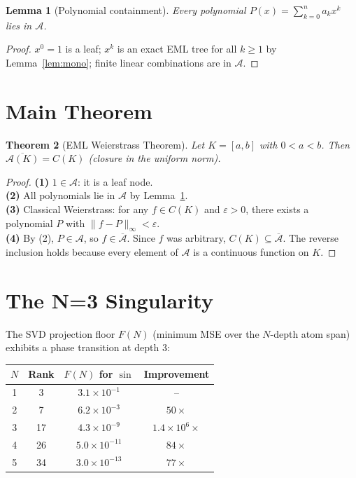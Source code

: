 \documentclass[11pt]{article}
\newtheorem{theorem}{Theorem}
\newtheorem{lemma}[theorem]{Lemma}
\theoremstyle{remark}
\begin{document}
\begin{lemma}[Polynomial containment]\label{lem:poly}
Every polynomial $P(x) = \sum_{k=0}^n a_k x^k$ lies in $\mathcal{A}$.
\end{lemma}
\begin{proof}
$x^0 = 1$ is a leaf; $x^k$ is an exact EML tree for all $k \geq 1$ by
Lemma~\ref{lem:mono}; finite linear combinations are in $\mathcal{A}$.
\end{proof}

\section{Main Theorem}

\begin{theorem}[EML Weierstrass Theorem]\label{thm:weierstrass}
Let $K = [a,b]$ with $0 < a < b$.  Then
$\overline{\mathcal{A}(K)} = C(K)$ (closure in the uniform norm).
\end{theorem}
\begin{proof}
\textbf{(1)} $1 \in \mathcal{A}$: it is a leaf node.\\
\textbf{(2)} All polynomials lie in $\mathcal{A}$ by Lemma~\ref{lem:poly}.\\
\textbf{(3)} Classical Weierstrass: for any $f \in C(K)$ and $\varepsilon > 0$,
there exists a polynomial $P$ with $\|f - P\|_\infty < \varepsilon$.\\
\textbf{(4)} By (2), $P \in \mathcal{A}$, so $f \in \overline{\mathcal{A}}$.
Since $f$ was arbitrary, $C(K) \subseteq \overline{\mathcal{A}}$.
The reverse inclusion holds because every element of $\mathcal{A}$
is a continuous function on $K$.
\end{proof}

\section{The N=3 Singularity}

The SVD projection floor $F(N)$ (minimum MSE over the $N$-depth atom span)
exhibits a phase transition at depth 3:

\begin{center}
\begin{tabular}{cccc}
\hline
$N$ & Rank & $F(N)$ for $\sin$ & Improvement \\
\hline
1 & 3  & $3.1 \times 10^{-1}$ & -- \\
2 & 7  & $6.2 \times 10^{-3}$ & $50\times$ \\
3 & 17 & $4.3 \times 10^{-9}$ & $1.4\times 10^6\times$ \\
4 & 26 & $5.0 \times 10^{-11}$ & $84\times$ \\
5 & 34 & $3.0 \times 10^{-13}$ & $77\times$ \\
\hline
\end{tabular}
\end{center}
\end{document}
